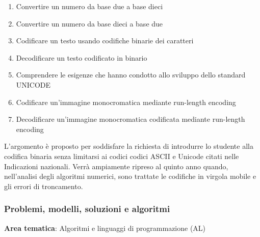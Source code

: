     
\begin{enumerate}
  \item Convertire un numero da base due a base dieci
  \item Convertire un numero da base dieci a base due
  \item Codificare un testo usando codifiche binarie dei caratteri
  \item Decodificare un testo codificato in binario
  \item Comprendere le esigenze che hanno condotto allo sviluppo dello standard UNICODE
  \item Codificare un'immagine monocromatica mediante run-length encoding
  \item Decodificare un'immagine monocromatica codificata mediante run-length encoding
\end{enumerate}

L'argomento è proposto per soddisfare la richiesta di introdurre lo studente alla codifica binaria
senza limitarsi ai codici codici ASCII e Unicode citati nelle Indicazioni nazionali.
Verrà ampiamente ripreso al quinto anno quando, nell'analisi degli algoritmi numerici,
sono trattate le codifiche in virgola mobile e gli errori di troncamento.



\subsubsection[Problemi e algoritmi]{Problemi, modelli, soluzioni e algoritmi}
\label{sec:problemi-e algoritmi}

\noindent\textbf{Area tematica}: Algoritmi e linguaggi di programmazione (AL)

    
